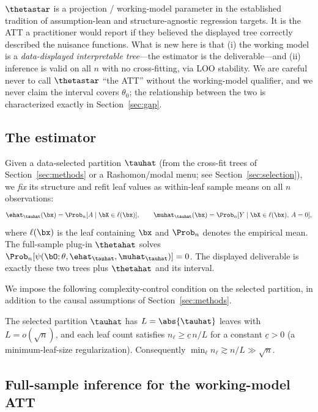 \begin{remark}
\label{rem:estimand-legit}
$\thetastar$ is a projection / working-model parameter in the established tradition of
assumption-lean and structure-agnostic regression targets. It is the ATT a practitioner
would report if they believed the displayed tree correctly described the nuisance
functions. What is new here is that (i) the working model is a \emph{data-displayed
interpretable tree}---the estimator is the deliverable---and (ii) inference is valid on
all $n$ with no cross-fitting, via LOO stability. We are careful never to call
$\thetastar$ ``the ATT'' without the working-model qualifier, and we never claim the
interval covers $\theta_0$; the relationship between the two is characterized exactly
in Section~\ref{sec:gap}.
\end{remark}

\subsection{The estimator}
\label{sec:wm-estimator}

Given a data-selected partition $\tauhat$ (from the cross-fit trees of
Section~\ref{sec:methods} or a Rashomon/modal menu; see Section~\ref{sec:selection}),
we \emph{fix} its structure and refit leaf values as within-leaf sample means on all
$n$ observations:
\[
\ehat_{\tauhat}(\bx) = \Prob_n[A \mid \bX \in \ell(\bx)],
\qquad
\muhat_{\tauhat}(\bx) = \Prob_n[Y \mid \bX \in \ell(\bx),\, A = 0],
\]
where $\ell(\bx)$ is the leaf containing $\bx$ and $\Prob_n$ denotes the empirical
mean. The full-sample plug-in $\thetahat$ solves
$\Prob_n[\psi(\bO; \theta, \ehat_{\tauhat}, \muhat_{\tauhat})] = 0$. The displayed
deliverable is exactly these two trees plus $\thetahat$ and its interval.

We impose the following complexity-control condition on the selected partition, in
addition to the causal assumptions of Section~\ref{sec:methods}.

\begin{assumption}
\label{assump:leaves}
The selected partition $\tauhat$ has $L = \abs{\tauhat}$ leaves with
$L = o(\sqrt{n})$, and each leaf count satisfies $n_\ell \ge \underline{c}\, n / L$
for a constant $\underline{c} > 0$ (a minimum-leaf-size regularization). Consequently
$\min_\ell n_\ell \gtrsim n / L \gg \sqrt{n}$.
\end{assumption}

\subsection{Full-sample inference for the working-model ATT}
\label{sec:wm-clt}

